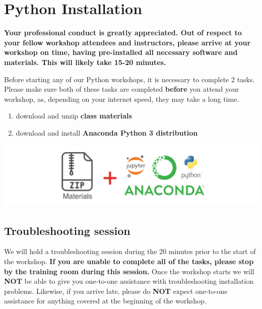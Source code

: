 \documentclass[
]{book}
\providecommand{\tightlist}{%
  \setlength{\itemsep}{0pt}\setlength{\parskip}{0pt}}
\begin{document}
\hypertarget{python-installation}{%
\chapter{Python Installation}\label{python-installation}}

\begin{alert}

\textbf{Your professional conduct is greatly appreciated. Out of respect to your fellow workshop attendees and instructors, please arrive at your workshop on time, having pre-installed all necessary software and materials. This will likely take 15-20 minutes.}

\end{alert}

Before starting any of our Python workshops, it is necessary to complete 2 tasks. Please make sure both of these tasks are completed \textbf{before} you attend your workshop, as, depending on your internet speed, they may take a long time.

\begin{enumerate}
\def\labelenumi{\arabic{enumi}.}
\tightlist
\item
  download and unzip \textbf{class materials}
\item
  download and install \textbf{Anaconda Python 3 distribution}
\end{enumerate}

\includegraphics{Python/PythonInstall/images/install_software_Python.png}

\hypertarget{troubleshooting-session-1}{%
\section{Troubleshooting session}\label{troubleshooting-session-1}}

We will hold a troubleshooting session during the 20 minutes prior to the start of the workshop.
\textbf{If you are unable to complete all of the tasks, please stop by the training room during this session.}
Once the workshop starts we will \textbf{NOT} be able to give you one-to-one assistance with troubleshooting installation problems. Likewise, if you arrive late, please do \textbf{NOT} expect one-to-one assistance for anything covered at the beginning of the workshop.
\end{document}

